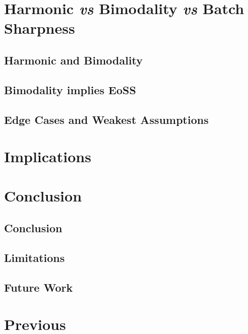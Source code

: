 \documentclass{article} %
\theoremstyle{plain}
\theoremstyle{definition}
\begin{document}
\section{Harmonic \textit{vs} Bimodality \textit{vs} Batch Sharpness}

\subsection{Harmonic and Bimodality}

\subsection{Bimodality implies EoSS}

\subsection{Edge Cases and Weakest Assumptions}

\section{Implications}

\section{Conclusion}
\subsection{Conclusion}

\subsection{Limitations}

\subsection{Future Work}



\newpage


\section{Previous}
\end{document}
